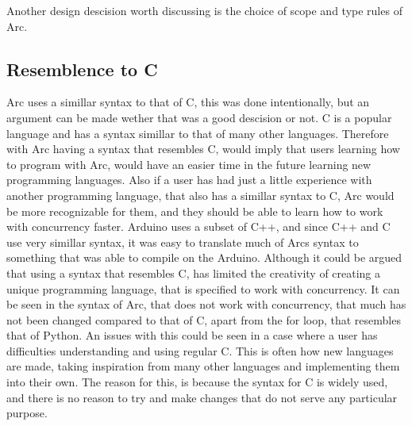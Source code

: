 
Another design descision worth discussing is the choice of scope and type rules of Arc. 

\subsection{Resemblence to C}
Arc uses a simillar syntax to that of C, this was done intentionally, but an argument can be made wether that was a good descision or not. C is a popular language and has a syntax simillar to that of many other languages. Therefore with Arc having a syntax that resembles C, would imply that users learning how to program with Arc, would have an easier time in the future learning new programming languages. Also if a user has had just a little experience with another programming language, that also has a simillar syntax to C, Arc would be more recognizable for them, and they should be able to learn how to work with concurrency faster. Arduino uses a subset of C++, and since C++ and C use very simillar syntax, it was easy to translate much of Arcs syntax to something that was able to compile on the Arduino.
Although it could be argued that using a syntax that resembles C, has limited the creativity of creating a unique programming language, that is specified to work with concurrency. It can be seen in the syntax of Arc, that does not work with concurrency, that much has not been changed compared to that of C, apart from the for loop, that resembles that of Python. An issues with this could be seen in a case where a user has difficulties understanding and using regular C. This is often how new languages are made, taking inspiration from many other languages and implementing them into their own. The reason for this, is because the syntax for C is widely used, and there is no reason to try and make changes that do not serve any particular purpose. 

